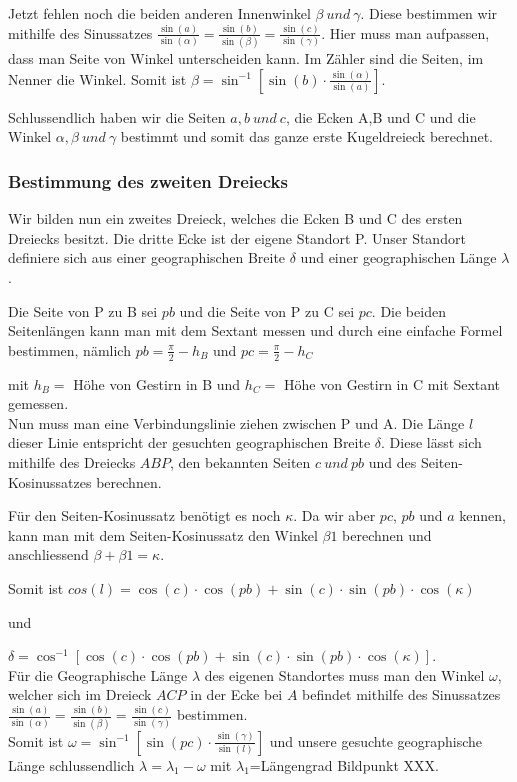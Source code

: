 Jetzt fehlen noch die beiden anderen Innenwinkel $\beta \ und\ \gamma$.
Diese bestimmen wir mithilfe des Sinussatzes $\frac{\sin (a)}{\sin (\alpha)} =\frac{\sin (b)}{\sin (\beta)} = \frac{\sin (c)}{\sin (\gamma)}$.
Hier muss man aufpassen, dass man Seite von Winkel unterscheiden kann. 
Im Zähler sind die Seiten, im Nenner die Winkel. 
Somit ist $\beta =\sin^{-1} [\sin(b) \cdot \frac{\sin(\alpha)}{\sin(a)}] $.

Schlussendlich haben wir die Seiten $a,b\ und \ c$, die Ecken A,B und C und die Winkel $\alpha, \beta \ und \ \gamma$ bestimmt und somit das ganze erste Kugeldreieck berechnet.

\subsubsection{Bestimmung des zweiten Dreiecks}
Wir bilden nun ein zweites Dreieck, welches die Ecken B und C des ersten Dreiecks besitzt. 
Die dritte Ecke ist der eigene Standort P.
Unser Standort definiere sich aus einer geographischen Breite $\delta$ und einer geographischen Länge $\lambda$. 

Die Seite von P zu B sei $pb$ und die Seite von P zu C sei $pc$.
Die beiden Seitenlängen kann man mit dem Sextant messen und durch eine einfache Formel bestimmen, nämlich $pb=\frac{\pi}{2} - h_{B}$ und $pc=\frac{\pi}{2} - h_{C}$ 

mit $h_B=$ Höhe von Gestirn in B und $h_C=$ Höhe von Gestirn in C mit Sextant gemessen.
\\

Nun muss man eine Verbindungslinie ziehen zwischen P und A. Die Länge $l$ dieser Linie entspricht der gesuchten geographischen Breite $\delta$. Diese lässt sich mithilfe des Dreiecks $ABP$, den bekannten Seiten $c\ und \ pb$ und des Seiten-Kosinussatzes berechnen.

Für den Seiten-Kosinussatz benötigt es noch $\kappa$. 
Da wir aber $pc$, $pb$ und $a$ kennen, kann man mit dem Seiten-Kosinussatz den Winkel $\beta1$ berechnen und anschliessend $\beta + \beta1 =\kappa$.

Somit ist $cos(l) = \cos(c)\cdot \cos(pb) + \sin(c) \cdot \sin(pb) \cdot \cos(\kappa)$

und

$\delta  =\cos^{-1} [\cos(c) \cdot \cos(pb) + \sin(c) \cdot \sin(pb) \cdot \cos(\kappa)]$.
\\

Für die Geographische Länge $\lambda$ des eigenen Standortes muss man den Winkel $\omega$, welcher sich im Dreieck $ACP$ in der Ecke bei $A$ befindet mithilfe des Sinussatzes $\frac{\sin (a)}{\sin (\alpha)} =\frac{\sin (b)}{\sin (\beta)} = \frac{\sin (c)}{\sin (\gamma)}$ bestimmen. 
\\

Somit ist $\omega=\sin^{-1}[\sin(pc) \cdot \frac{\sin(\gamma)}{\sin(l)}]$ und unsere gesuchte geographische Länge schlussendlich 
$\lambda=\lambda_1 - \omega$ mit $\lambda_1$=Längengrad Bildpunkt XXX.
\newpage
\listoffigures